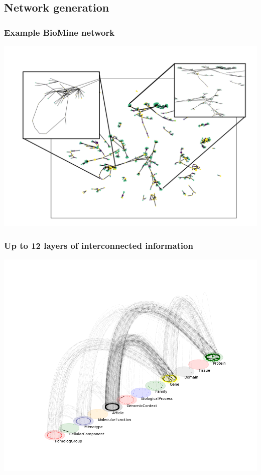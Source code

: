 \documentclass{beamer}
\begin{document}
  \subsection{Network generation}
\begin{frame}\frametitle{Example BioMine network}
   \includegraphics[scale=0.60]{images/collage}
\end{frame}


\begin{frame}\frametitle{Up to 12 layers of interconnected information}  
  \includegraphics[scale=0.42]{images/SNPmpx}    
\end{frame}
\end{document}
